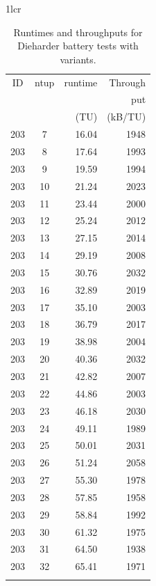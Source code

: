 \documentclass[
  digital,     %
  oneside,     %
  nosansbold,  %
  nocolorbold, %
  nolof,         %
  nolot,         %
]{fithesis4}
\begin{document}
\begin{table}[H]
\begin{tabularx}{1\textwidth}{lcr}
    {\begin{tabularx}{0.5\textwidth}{c|c|r|r}
       ID & ntup & runtime & Through\\
         & & & put \\
         & & (TU) & (kB/TU) \\
        \midrule 
        203 & 7 & 16.04 & 1948 \\
        203 & 8 & 17.64 & 1993 \\
        203 & 9 & 19.59 & 1994 \\
        203 & 10 & 21.24 & 2023 \\
        203 & 11 & 23.44 & 2000 \\
        203 & 12 & 25.24 & 2012 \\
        203 & 13 & 27.15 & 2014 \\
        203 & 14 & 29.19 & 2008 \\
        203 & 15 & 30.76 & 2032 \\
        203 & 16 & 32.89 & 2019 \\
        203 & 17 & 35.10 & 2003 \\
        203 & 18 & 36.79 & 2017 \\
        203 & 19 & 38.98 & 2004 \\
        203 & 20 & 40.36 & 2032 \\
        203 & 21 & 42.82 & 2007 \\
        203 & 22 & 44.86 & 2003 \\
        203 & 23 & 46.18 & 2030 \\
        203 & 24 & 49.11 & 1989 \\
        203 & 25 & 50.01 & 2031 \\
        203 & 26 & 51.24 & 2058 \\
        203 & 27 & 55.30 & 1978 \\
        203 & 28 & 57.85 & 1958 \\
        203 & 29 & 58.84 & 1992 \\
        203 & 30 & 61.32 & 1975 \\
        203 & 31 & 64.50 & 1938 \\
        203 & 32 & 65.41 & 1971 \\
         \\

    \end{tabularx}} 
  \end{tabularx}
  \caption{Runtimes and throughputs for Dieharder battery tests with variants.}
  \label{tab:analysis_time_dieharder_variants}
\end{table}
\end{document}
